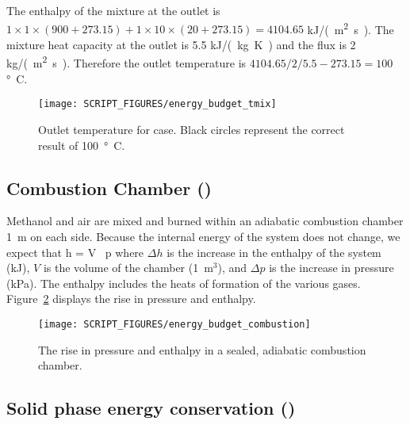 \documentclass[11pt]{book}
\begin{document}
The enthalpy of the mixture at the outlet is $1 \times 1 \times (900+273.15) + 1 \times 10 \times (20+273.15) = 4104.65$ \si{kJ/(m^2.s)}.  The mixture heat capacity at the outlet is 5.5 \si{kJ/(kg.K)} and the flux is 2 \si{kg/(m^2.s)}.  Therefore the outlet temperature is $4104.65/2/5.5 - 273.15 = 100$ \si{\degree C}.
\begin{figure}[ht]
\centering
\texttt{[image: SCRIPT\_FIGURES/energy\_budget\_tmix]}
\caption[The  test case]{\label{fig_outlet_temperature} Outlet temperature for  case.  Black circles represent the correct result of 100~\si{\degree C}.}
\end{figure}


\subsection{Combustion Chamber (\texorpdfstring{}{energy\_budget\_combustion})}
\label{energy_budget_combustion}

Methanol and air are mixed and burned within an adiabatic combustion chamber 1~m on each side. Because the internal energy of the system does not change, we expect that
\be
\Delta h = V \, \Delta p
\ee
where $\Delta h$ is the increase in the enthalpy of the system (kJ), $V$ is the volume of the chamber (1~m$^3$), and $\Delta p$ is the increase in pressure (kPa). The enthalpy includes the heats of formation of the various gases. Figure~\ref{fig_energy_budget_combustion} displays the rise in pressure and enthalpy.
\begin{figure}[ht]
\centering
\texttt{[image: SCRIPT\_FIGURES/energy\_budget\_combustion]}
\caption[The  test case]{The rise in pressure and enthalpy in a sealed, adiabatic combustion chamber.}
\label{fig_energy_budget_combustion}
\end{figure}



\subsection{Solid phase energy conservation (\texorpdfstring{}{energy\_budget\_solid})}
\label{energy_budget_solid}
\end{document}
